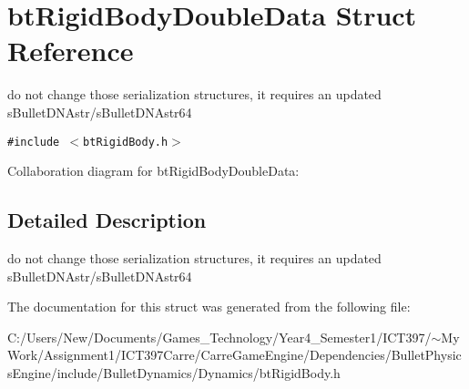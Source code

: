 \hypertarget{structbt_rigid_body_double_data}{
\section{btRigidBodyDoubleData Struct Reference}
\label{structbt_rigid_body_double_data}
}
do not change those serialization structures, it requires an updated sBulletDNAstr/sBulletDNAstr64  


{\tt \#include $<$btRigidBody.h$>$}

Collaboration diagram for btRigidBodyDoubleData:

\subsection{Detailed Description}
do not change those serialization structures, it requires an updated sBulletDNAstr/sBulletDNAstr64 

The documentation for this struct was generated from the following file:\begin{CompactItemize}
\item 
C:/Users/New/Documents/Games\_\-Technology/Year4\_\-Semester1/ICT397/$\sim$My Work/Assignment1/ICT397Carre/CarreGameEngine/Dependencies/BulletPhysicsEngine/include/BulletDynamics/Dynamics/btRigidBody.h\end{CompactItemize}
